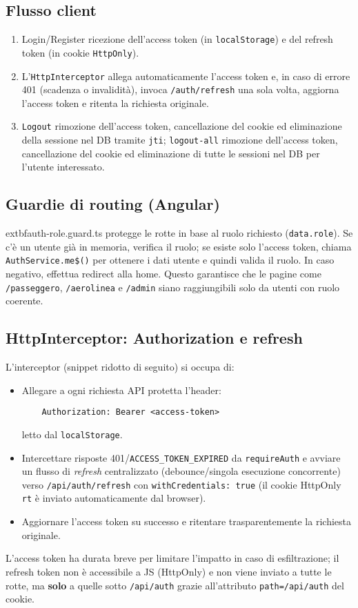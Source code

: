 \documentclass[12pt,a4paper]{article}
\begin{document}
\subsection{Flusso client}
\begin{enumerate}[noitemsep]
	\item Login/Register \textrightarrow{} ricezione dell'access token (in \texttt{localStorage}) e del refresh token (in cookie \texttt{HttpOnly}).
    \item L'\texttt{HttpInterceptor} allega automaticamente l'access token e, in caso di errore 401 (scadenza o invalidità), invoca \texttt{/auth/refresh} una sola volta, aggiorna l'access token e ritenta la richiesta originale.
    \item \texttt{Logout} \textrightarrow{} rimozione dell'access token, cancellazione del cookie ed eliminazione della sessione nel DB tramite \texttt{jti}; 
    \texttt{logout-all} \textrightarrow{} rimozione dell'access token, cancellazione del cookie ed eliminazione di tutte le sessioni nel DB per l'utente interessato.
\end{enumerate}

\subsection{Guardie di routing (Angular)}
		extbf{auth-role.guard.ts} protegge le rotte in base al ruolo richiesto (\texttt{data.role}). Se c'è un utente già in memoria, verifica il ruolo; se esiste solo l'access token, chiama \texttt{AuthService.me\$()} per ottenere i dati utente e quindi valida il ruolo. In caso negativo, effettua redirect alla home. Questo garantisce che le pagine come \texttt{/passeggero}, \texttt{/aerolinea} e \texttt{/admin} siano raggiungibili solo da utenti con ruolo coerente.

\subsection{HttpInterceptor: Authorization e refresh}
L'interceptor (snippet ridotto di seguito) si occupa di:
\begin{itemize}[noitemsep]
	\item Allegare a ogni richiesta API protetta l'header:
	\begin{verbatim}
	Authorization: Bearer <access-token>
	\end{verbatim}
	letto dal \texttt{localStorage}.
	\item Intercettare risposte 401/\texttt{ACCESS\_TOKEN\_EXPIRED} da \texttt{requireAuth} e avviare un flusso di \emph{refresh} centralizzato (debounce/singola esecuzione concorrente) verso \texttt{/api/auth/refresh} con \texttt{withCredentials: true} (il cookie HttpOnly \texttt{rt} è inviato automaticamente dal browser).
	\item Aggiornare l'access token su successo e ritentare trasparentemente la richiesta originale.
\end{itemize}
L'access token ha durata breve per limitare l'impatto in caso di esfiltrazione; il refresh token non è accessibile a JS (HttpOnly) e non viene inviato a tutte le rotte, ma \textbf{solo} a quelle sotto \texttt{/api/auth} grazie all'attributo \texttt{path=/api/auth} del cookie.
\end{document}
